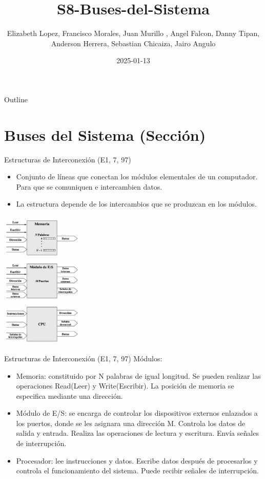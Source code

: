 \documentclass[presentation]{beamer}
\author{Elizabeth Lopez, Francisco Morales, Juan Murillo , Angel Falcon, Danny Tipan, Anderson Herrera, Sebastian Chicaiza, Jairo Angulo}
\date{2025-01-13}
\title{S8-Buses-del-Sistema}
\begin{document}
\maketitle
\begin{frame}{Outline}
\tableofcontents
\end{frame}



\section{Buses del Sistema (Sección)}
\label{sec:org274efe4}
\begin{frame}[label={sec:org17f1210}]{Estructuras de Interconexión (E1, 7, 97)}
\begin{itemize}
\item Conjunto de líneas que conectan los módulos elementales de un computador.
Para que se comuniquen e intercambien datos.
\item La estructura depende de los intercambios que se produzcan en los módulos.
\end{itemize}

\begin{center}
\includegraphics[width=0.3\textwidth]{./Images/Modulos.jpg}
\end{center}
\end{frame}

\begin{frame}[label={sec:orgbab70de}]{Estructuras de Interconexión (E1, 7, 97)}
\alert{Módulos:}

\begin{itemize}
\item \alert{\alert{Memoria:}} constituido por N palabras de igual longitud. Se pueden realizar las
operaciones Read(Leer) y Write(Escribir). La posición de memoria se especifica
mediante una dirección.
\item \alert{\alert{Módulo de E/S:}} se encarga de controlar los dispositivos externos enlazados
a los puertos, donde se les asignara una dirección M. Controla los datos de salida
y entrada. Realiza las operaciones de lectura y escritura. Envía señales de interrupción.
\item \alert{\alert{Procesador:}} lee instrucciones y datos. Escribe datos después de procesarlos y
controla el funcionamiento del sistema. Puede recibir señales de interrupción.
\end{itemize}
\end{frame}
\end{document}
